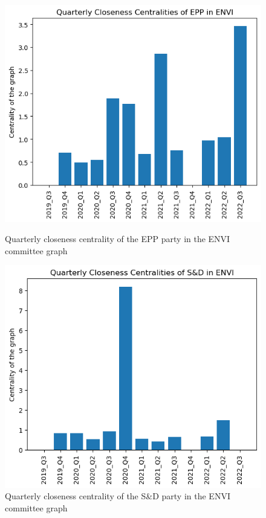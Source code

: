 \documentclass[lettersize,journal]{IEEEtran}
\begin{document}
\begin{figure}[h]
  \centering
  \begin{minipage}[b]{0.23\textwidth}
    \includegraphics[width=\textwidth]{EPP_ENVI_Q_closeness.png}
    \caption{Quarterly closeness centrality of the EPP party in the ENVI committee graph}
    \label{EPP_ENVI_Q_closeness}
  \end{minipage}
  \hfill
  \begin{minipage}[b]{0.23\textwidth}
    \includegraphics[width=\textwidth]{S&D_ENVI_Q_closeness.png}
    \caption{Quarterly closeness centrality of the S\&D party in the ENVI committee graph}
    \label{S&D_ENVI_Q_closeness}
  \end{minipage}
\end{figure}
\end{document}
